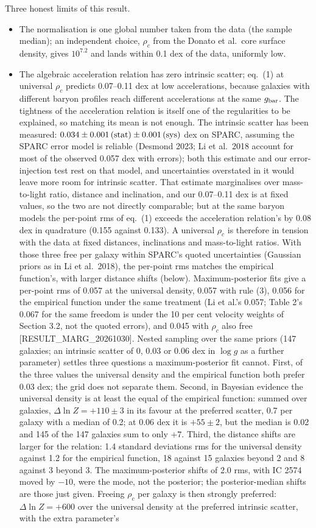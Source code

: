 \documentclass[
  10pt,
]{article}
\begin{document}
Three honest limits of this result.
\begin{itemize}
\item[(i)] The normalisation is one global number taken from the data (the sample median); an independent choice, $\rho_c$ from the Donato et al.~core surface density, gives $10^{7.2}$ and lands within 0.1 dex of the data, uniformly low.
\item[(ii)] The algebraic acceleration relation has zero intrinsic scatter; eq.~(1) at universal $\rho_c$ predicts 0.07--0.11 dex at low accelerations, because galaxies with different baryon profiles reach different accelerations at the same $g_{\rm bar}$. The tightness of the acceleration relation is itself one of the regularities to be explained, so matching its mean is not enough. The intrinsic scatter has been measured: $0.034\pm0.001\,{\rm(stat)}\pm0.001\,{\rm(sys)}$ dex on SPARC, assuming the SPARC error model is reliable (Desmond 2023; Li et al.~2018 account for most of the observed 0.057 dex with errors); both this estimate and our error-injection test rest on that model, and uncertainties overstated in it would leave more room for intrinsic scatter. That estimate marginalises over mass-to-light ratio, distance and inclination, and our 0.07--0.11 dex is at fixed values, so the two are not directly comparable; but at the same baryon models the per-point rms of eq.~(1) exceeds the acceleration relation's by 0.08 dex in quadrature (0.155 against 0.133). A universal $\rho_c$ is therefore in tension with the data at fixed distances, inclinations and mass-to-light ratios. With those three free per galaxy within SPARC's quoted uncertainties (Gaussian priors as in Li et al.~2018), the per-point rms matches the empirical function's, with larger distance shifts (below). Maximum-posterior fits give a per-point rms of 0.057 at the universal density, 0.057 with rule (3), 0.056 for the empirical function under the same treatment (Li et al.'s 0.057; Table 2's 0.067 for the same freedom is under the 10 per cent velocity weights of Section 3.2, not the quoted errors), and 0.045 with $\rho_c$ also free {[}RESULT\_MARG\_20261030{]}. Nested sampling over the same priors (147 galaxies; an intrinsic scatter of 0, 0.03 or 0.06 dex in $\log g$ as a further parameter) settles three questions a maximum-posterior fit cannot. First, of the three values the universal density and the empirical function both prefer 0.03 dex; the grid does not separate them. Second, in Bayesian evidence the universal density is at least the equal of the empirical function: summed over galaxies, $\Delta\ln Z=+110\pm3$ in its favour at the preferred scatter, 0.7 per galaxy with a median of 0.2; at 0.06 dex it is $+55\pm2$, but the median is 0.02 and 145 of the 147 galaxies sum to only $+7$. Third, the distance shifts are larger for the relation: 1.4 standard deviations rms for the universal density against 1.2 for the empirical function, 18 against 15 galaxies beyond 2 and 8 against 3 beyond 3. The maximum-posterior shifts of 2.0 rms, with IC 2574 moved by $-10$, were the mode, not the posterior; the posterior-median shifts are those just given. Freeing $\rho_c$ per galaxy is then strongly preferred: $\Delta\ln Z=+600$ over the universal density at the preferred intrinsic scatter, with the extra parameter's 
\end{itemize}
\end{document}
